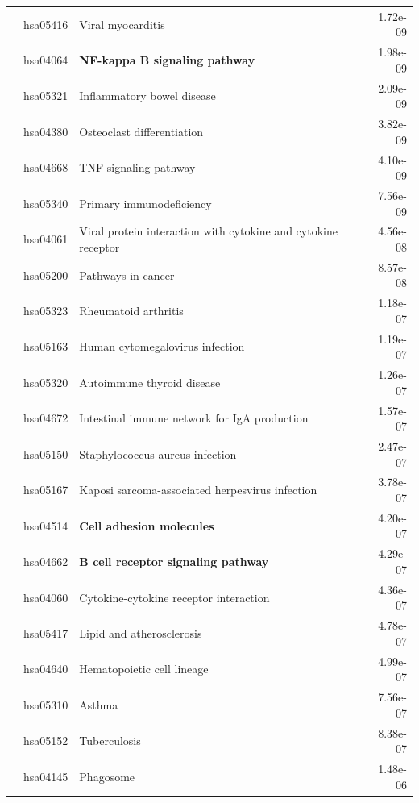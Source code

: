 \begin{longtable}{cllr}
 \rowcolor{\clrmatch} & hsa05416 & Viral myocarditis & 1.72e-09 \\ 
 \rowcolor{\clrpath} & hsa04064 & \textbf{NF-kappa B signaling pathway} & 1.98e-09 \\ 
 \rowcolor{\clrmatch} & hsa05321 & Inflammatory bowel disease & 2.09e-09 \\ 
 & hsa04380 & \textcolor{\clrnew}{Osteoclast differentiation} & 3.82e-09 \\ 
 & hsa04668 & \textcolor{\clrnew}{TNF signaling pathway} & 4.10e-09 \\ 
 & hsa05340 & \textcolor{\clrnew}{Primary immunodeficiency} & 7.56e-09 \\ 
 & hsa04061 & \textcolor{\clrnew}{Viral protein interaction with cytokine and cytokine receptor} & 4.56e-08 \\ 
 & hsa05200 & \textcolor{\clrnew}{Pathways in cancer} & 8.57e-08 \\ 
 \rowcolor{\clrmatch} & hsa05323 & Rheumatoid arthritis & 1.18e-07 \\ 
 & hsa05163 & \textcolor{\clrnew}{Human cytomegalovirus infection} & 1.19e-07 \\ 
 \rowcolor{\clrmatch} & hsa05320 & Autoimmune thyroid disease & 1.26e-07 \\ 
 \rowcolor{\clrmatch} & hsa04672 & Intestinal immune network for IgA production & 1.57e-07 \\ 
 \rowcolor{\clrmatch} & hsa05150 & Staphylococcus aureus infection & 2.47e-07 \\ 
 & hsa05167 & \textcolor{\clrnew}{Kaposi sarcoma-associated herpesvirus infection} & 3.78e-07 \\ 
 \rowcolor{\clrpath} & hsa04514 & \textbf{Cell adhesion molecules} & 4.20e-07 \\ 
 \rowcolor{\clrpath} & hsa04662 & \textbf{B cell receptor signaling pathway} & 4.29e-07 \\ 
 \rowcolor{\clrmatch} & hsa04060 & Cytokine-cytokine receptor interaction & 4.36e-07 \\ 
 & hsa05417 & \textcolor{\clrnew}{Lipid and atherosclerosis} & 4.78e-07 \\ 
 \rowcolor{\clrmatch} & hsa04640 & Hematopoietic cell lineage & 4.99e-07 \\ 
 \rowcolor{\clrmatch} & hsa05310 & Asthma & 7.56e-07 \\ 
 \rowcolor{\clrmatch} & hsa05152 & Tuberculosis & 8.38e-07 \\ 
 \rowcolor{\clrmatch} & hsa04145 & Phagosome & 1.48e-06 \\ 

\end{longtable}
